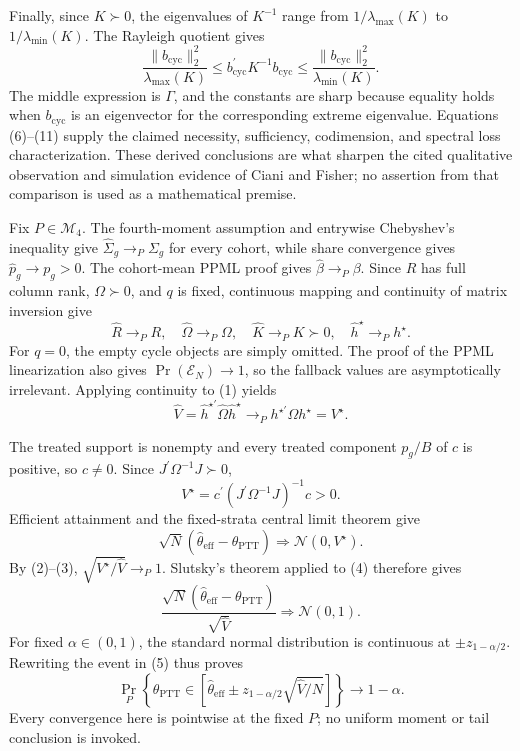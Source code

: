 Finally, since \(K\succ0\), the eigenvalues of \(K^{-1}\) range from
\(1/\lambda_{\max}(K)\) to \(1/\lambda_{\min}(K)\).  The Rayleigh quotient gives
\[
\frac{\|b_{\mathrm{cyc}}\|_2^2}{\lambda_{\max}(K)}
\le b_{\mathrm{cyc}}^{\prime}K^{-1}b_{\mathrm{cyc}}
\le\frac{\|b_{\mathrm{cyc}}\|_2^2}{\lambda_{\min}(K)}.              \tag{11}
\]
The middle expression is \(\Gamma\), and the constants are sharp because equality holds when \(b_{\mathrm{cyc}}\) is an eigenvector for the corresponding extreme eigenvalue.  Equations (6)--(11) supply the claimed necessity, sufficiency, codimension, and spectral loss characterization.  These derived conclusions are what sharpen the cited qualitative observation and simulation evidence of Ciani and Fisher; no assertion from that comparison is used as a mathematical premise.

Fix \(P\in\mathcal M_4\).  The fourth-moment assumption and entrywise Chebyshev's inequality give
\(\widehat\Sigma_g\to_P\Sigma_g\) for every cohort, while share convergence gives
\(\widehat p_g\to p_g>0\).  The cohort-mean PPML proof gives
\(\widehat\beta\to_P\beta\).  Since \(R\) has full column rank, \(\Omega\succ0\), and \(q\) is fixed, continuous mapping and continuity of matrix inversion give
\[
\widehat R\to_PR,
\quad
\widehat\Omega\to_P\Omega,
\quad
\widehat K\to_PK\succ0,
\quad
\widehat h^{\star}\to_Ph^{\star}.                                    \tag{1}
\]
For \(q=0\), the empty cycle objects are simply omitted.  The proof of the PPML linearization also gives
\(\Pr(\mathcal E_N)\to1\), so the fallback values are asymptotically irrelevant.  Applying continuity to (1) yields
\[
\widehat V
=\widehat h^{\star\prime}\widehat\Omega\widehat h^{\star}
\to_P h^{\star\prime}\Omega h^{\star}=V^{\star}.                     \tag{2}
\]

The treated support is nonempty and every treated component \(p_g/B\) of \(c\) is positive, so \(c\ne0\).  Since
\(J^{\prime}\Omega^{-1}J\succ0\),
\[
V^{\star}=c^{\prime}(J^{\prime}\Omega^{-1}J)^{-1}c>0.                 \tag{3}
\]
Efficient attainment and the fixed-strata central limit theorem give
\[
\sqrt N(\widehat\theta_{\mathrm{eff}}-\theta_{\mathrm{PTT}})
\Rightarrow\mathcal N(0,V^{\star}).                                   \tag{4}
\]
By (2)--(3), \(\sqrt{V^{\star}/\widehat V}\to_P1\).  Slutsky's theorem applied to (4) therefore gives
\[
\frac{\sqrt N(\widehat\theta_{\mathrm{eff}}-\theta_{\mathrm{PTT}})}
{\sqrt{\widehat V}}
\Rightarrow\mathcal N(0,1).                                           \tag{5}
\]
For fixed \(\alpha\in(0,1)\), the standard normal distribution is continuous at
\(\pm z_{1-\alpha/2}\).  Rewriting the event in (5) thus proves
\[
\Pr_P\!\left\{
\theta_{\mathrm{PTT}}\in
\left[\widehat\theta_{\mathrm{eff}}
\mathbin{\pm}z_{1-\alpha/2}\sqrt{\widehat V/N}\right]
\right\}\longrightarrow1-\alpha.
\]
Every convergence here is pointwise at the fixed \(P\); no uniform moment or tail conclusion is invoked.

